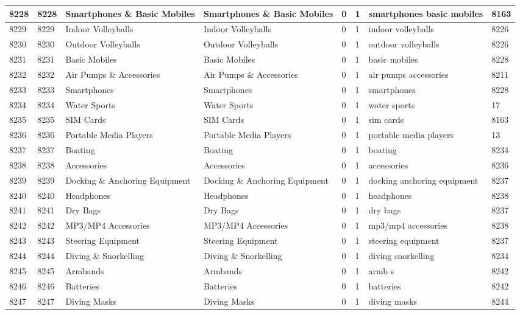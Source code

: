 \begin{longtable}{|l|l|l|l|l|l|l|l|}
8228 & 8228 & Smartphones \& Basic Mobiles & Smartphones \& Basic Mobiles & 0 & 1 & smartphones basic mobiles & 8163 \\ \hline 
8229 & 8229 & Indoor Volleyballs & Indoor Volleyballs & 0 & 1 & indoor volleyballs & 8226 \\ \hline 
8230 & 8230 & Outdoor Volleyballs & Outdoor Volleyballs & 0 & 1 & outdoor volleyballs & 8226 \\ \hline 
8231 & 8231 & Basic Mobiles & Basic Mobiles & 0 & 1 & basic mobiles & 8228 \\ \hline 
8232 & 8232 & Air Pumps \& Accessories & Air Pumps \& Accessories & 0 & 1 & air pumps accessories & 8211 \\ \hline 
8233 & 8233 & Smartphones & Smartphones & 0 & 1 & smartphones & 8228 \\ \hline 
8234 & 8234 & Water Sports & Water Sports & 0 & 1 & water sports & 17 \\ \hline 
8235 & 8235 & SIM Cards & SIM Cards & 0 & 1 & sim cards & 8163 \\ \hline 
8236 & 8236 & Portable Media Players & Portable Media Players & 0 & 1 & portable media players & 13 \\ \hline 
8237 & 8237 & Boating & Boating & 0 & 1 & boating & 8234 \\ \hline 
8238 & 8238 & Accessories & Accessories & 0 & 1 & accessories & 8236 \\ \hline 
8239 & 8239 & Docking \& Anchoring Equipment & Docking \& Anchoring Equipment & 0 & 1 & docking anchoring equipment & 8237 \\ \hline 
8240 & 8240 & Headphones & Headphones & 0 & 1 & headphones & 8238 \\ \hline 
8241 & 8241 & Dry Bags & Dry Bags & 0 & 1 & dry bags & 8237 \\ \hline 
8242 & 8242 & MP3/MP4 Accessories & MP3/MP4 Accessories & 0 & 1 & mp3/mp4 accessories & 8238 \\ \hline 
8243 & 8243 & Steering Equipment & Steering Equipment & 0 & 1 & steering equipment & 8237 \\ \hline 
8244 & 8244 & Diving \& Snorkelling & Diving \& Snorkelling & 0 & 1 & diving snorkelling & 8234 \\ \hline 
8245 & 8245 & Armbands & Armbands & 0 & 1 & armb s & 8242 \\ \hline 
8246 & 8246 & Batteries & Batteries & 0 & 1 & batteries & 8242 \\ \hline 
8247 & 8247 & Diving Masks & Diving Masks & 0 & 1 & diving masks & 8244 \\ \hline 

\end{longtable}

